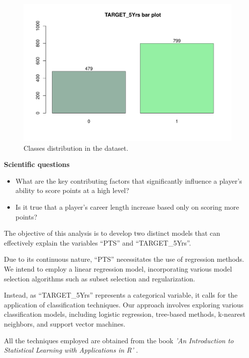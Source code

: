 \begin{figure}[H]
	\centering
	\includegraphics[width=0.6\linewidth]{ImageFiles/Histograms/bp_target5yrs.pdf}
	\caption{Classes distribution in the dataset.}
	\label{fig:target_bar_plot}
\end{figure}

\textbf{Scientific questions}
\begin{itemize}
	\item What are the key contributing factors that significantly influence a player's ability to score points at a high level?
	\item Is it true that a player's career length increase based only on scoring more points?
\end{itemize}

\noindent
The objective of this analysis is to develop two distinct models that can effectively explain the variables ``PTS'' and ``TARGET\_5Yrs''. 
 
Due to its continuous nature, ``PTS'' necessitates the use of regression methods. We intend to employ a linear regression model, incorporating various model selection algorithms such as subset selection and regularization.

Instead, as ``TARGET\_5Yrs'' represents a categorical variable, it calls for the application of classification techniques. Our approach involves exploring various classification models, including logistic regression, tree-based methods, k-nearest neighbors, and support vector machines.

All the techniques employed are obtained from the book \textit{'An Introduction to Statistical Learning with Applications in R'} \cite{James2013}.